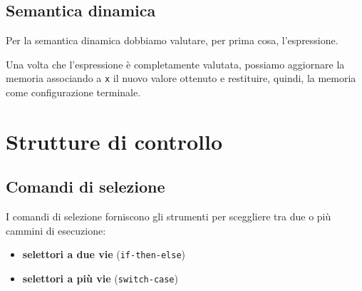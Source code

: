 



\subsection{Semantica dinamica}
Per la semantica dinamica dobbiamo valutare, per prima cosa, l'espressione.


Una volta che l'espressione è completamente valutata, possiamo aggiornare la memoria associando a \texttt{x} il nuovo valore ottenuto e restituire, quindi, la memoria come configurazione terminale.



\section{Strutture di controllo}

\subsection{Comandi di selezione}
I comandi di selezione forniscono gli strumenti per sceggliere tra due o più cammini di esecuzione:
\begin{itemize}[label=$\triangleright$, itemsep=\smallskipamount]
    \item \textbf{selettori a due vie} (\texttt{if-then-else})
    \item \textbf{selettori a più vie} (\texttt{switch-case})
\end{itemize}


